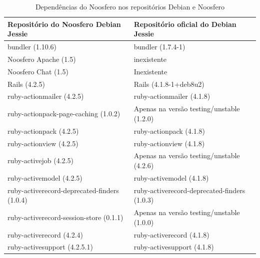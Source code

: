 \begin{anexosenv}
\begin{longtable}[H]{l|l}
				\caption{Dependências do Noosfero nos repositórios Debian e Noosfero}\\
        \hline
        Repositório do Noosfero Debian Jessie & Repositório oficial do Debian Jessie                   \\ \hline
        bundler (1.10.6)                                 & bundler (1.7.4-1)                                                 \\ 
        Noosfero Apache (1.5)                            & inexistente                                                       \\ 
        Noosfero Chat (1.5)                              & Inexistente                                                       \\ 
        Rails (4.2.5)                                    & Rails (4.1.8-1+deb8u2)                                            \\ 
        ruby-actionmailer (4.2.5)                        & ruby-actionmailer (4.1.8)                                         \\ 
        ruby-actionpack-page-caching (1.0.2)             & Apenas na versão testing/unstable (1.2.0)  \\ 
        ruby-actionpack (4.2.5)                          & ruby-actionpack (4.1.8)                                           \\ 
        ruby-actionview (4.2.5)                          & ruby-actionview (4.1.8)                                           \\ 
         ruby-activejob (4.2.5)                          & Apenas na versão testing/unstable (4.2.6)  \\ 
        ruby-activemodel (4.2.5)                         & ruby-activemodel (4.1.8)                                          \\ 
        ruby-activerecord-deprecated-finders (1.0.4)     & ruby-activerecord-deprecated-finders (1.0.3)                      \\ 
        ruby-activerecord-session-store (0.1.1)          & Apenas na versão testing/unstable (1.0.0)  \\ 
        ruby-activerecord (4.2.4)                        & ruby-activerecord (4.1.8)                                         \\ 
        ruby-activesupport (4.2.5.1)                     & ruby-activesupport (4.1.8)                                        \\ 

\end{longtable}
\end{anexosenv}
